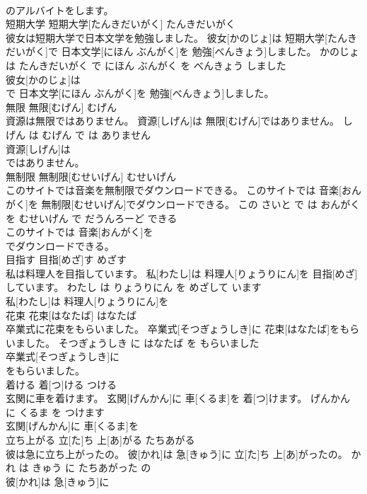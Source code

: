 \documentclass[8pt]{extreport}
\begin{document}
\begin{CJK}{UTF8}{min}
\\	のアルバイトをします。			
\\	短期大学	短期大学[たんきだいがく]	たんきだいがく	
\\	彼女は短期大学で日本文学を勉強しました。	彼女[かのじょ]は 短期大学[たんきだいがく]で 日本文学[にほん ぶんがく]を 勉強[べんきょう]しました。	かのじょ は たんきだいがく で にほん ぶんがく を べんきょう しました	
\\	彼女[かのじょ]は
\\	で 日本文学[にほん ぶんがく]を 勉強[べんきょう]しました。			
\\	無限	無限[むげん]	むげん	
\\	資源は無限ではありません。	資源[しげん]は 無限[むげん]ではありません。	しげん は むげん で は ありません	
\\	資源[しげん]は
\\	ではありません。			
\\	無制限	無制限[むせいげん]	むせいげん	
\\	このサイトでは音楽を無制限でダウンロードできる。	このサイトでは 音楽[おんがく]を 無制限[むせいげん]でダウンロードできる。	この さいと で は おんがく を むせいげん で だうんろーど できる	
\\	このサイトでは 音楽[おんがく]を
\\	でダウンロードできる。			
\\	目指す	目指[めざ]す	めざす	
\\	私は料理人を目指しています。	私[わたし]は 料理人[りょうりにん]を 目指[めざ]しています。	わたし は りょうりにん を めざして います	
\\	私[わたし]は 料理人[りょうりにん]を
\\	花束	花束[はなたば]	はなたば	
\\	卒業式に花束をもらいました。	卒業式[そつぎょうしき]に 花束[はなたば]をもらいました。	そつぎょうしき に はなたば を もらいました	
\\	卒業式[そつぎょうしき]に
\\	をもらいました。			
\\	着ける	着[つ]ける	つける	
\\	玄関に車を着けます。	玄関[げんかん]に 車[くるま]を 着[つ]けます。	げんかん に くるま を つけます	
\\	玄関[げんかん]に 車[くるま]を
\\	立ち上がる	立[た]ち 上[あ]がる	たちあがる	
\\	彼は急に立ち上がったの。	彼[かれ]は 急[きゅう]に 立[た]ち 上[あ]がったの。	かれ は きゅう に たちあがった の	
\\	彼[かれ]は 急[きゅう]に

\end{CJK}
\end{document}
